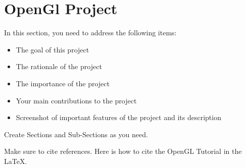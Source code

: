 \section{OpenGl Project}

In this section, you need to address the following items:

\begin{itemize}
\item The goal of this project
\item The rationale of the project 
\item The importance of the project
\item Your main contributions to the project  
\item Screenshot of important features of the project and its description
\end{itemize}

Create Sections and Sub-Sections as you need.

Make sure to cite references. Here is how to cite the OpenGL Tutorial \cite{opengl} in the LaTeX.